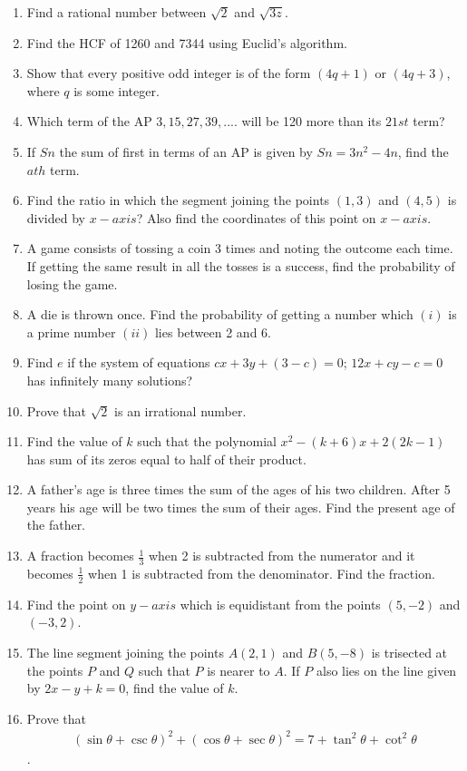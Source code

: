 \documentclass[12pt]{article}
\begin{document}
\begin{enumerate}
\begin{figure}[!ht]
		\end{figure}  
\item Find a rational number between $\sqrt{2}$ and $\sqrt{3
	z}$.
\item Find the HCF of 1260 and 7344 using Euclid's algorithm.
\item Show that every positive odd integer is of the form $(4q+1)$ or $(4q+3)$, where $q$ is some integer.
\item Which term of the AP $3, 15, 27, 39, ....$ will be 120 more than its $21st$ term?
\item If $Sn$ the sum of first in terms of an AP is given by $Sn=3n^2-4n$, find the $ath$ term.
\item Find the ratio in which the segment joining the points $(1, 3)$ and $(4, 5)$ is divided by $x-axis$? Also find the coordinates of this point on $x-axis$.
\item A game consists of tossing a coin 3 times and noting the outcome each time. If getting the same result in all the tosses is a success, find the probability of losing the game.
\item A die is thrown once. Find the probability of getting a number which $(i)$ is a prime number $(ii)$ lies between 2 and 6.
\item Find $e$ if the system of equations $cx+3y+(3-c)=0$; $12x+cy-c=0$ has infinitely many solutions?
\item Prove that $\sqrt{2}$ is an irrational number.
\item Find the value of $k$ such that the polynomial $ x^2-(k+6)x+2(2k-1)$ has sum of its zeros equal to half of their product.
\item A father's age is three times the sum of the ages of his two children. After 5 years his age will be two times the sum of their ages. Find the present age of the father.
\item A fraction becomes $\frac{1}{3}$ when 2 is subtracted from the numerator and it becomes $\frac{1}{2}$ when 1 is subtracted from the denominator. Find the fraction.
\item Find the point on $y-axis$ which is equidistant from the points $(5, -2)$ and $(-3, 2)$.
\item The line segment joining the points $A(2, 1)$ and $B(5, -8)$ is trisected at the points $P$ and $Q$ such that $P$ is nearer to $A$. If $P$ also lies on the line given by $2x-y+k=0$, find the value of $k$.
\item Prove that \begin{align*} (\sin\theta + \csc\theta)^2 + (\cos\theta + \sec\theta)^2 = 7 + \tan^2\theta + \cot^2\theta\end{align*}.

\end{enumerate}
\end{document}
